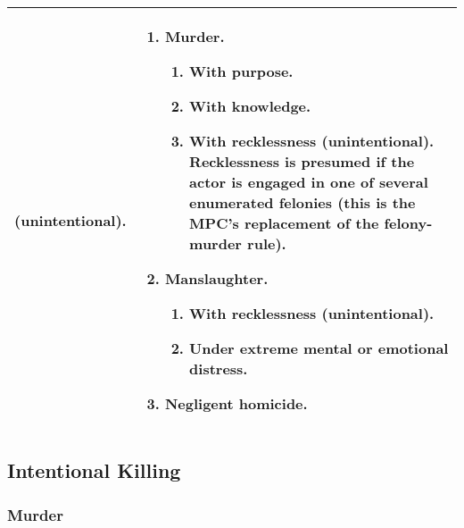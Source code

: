 \begin{tabular}{ | p{5.5cm} | p{5.5cm} |}
\begin{enumerate}
\begin{enumerate}
        (unintentional).
    \end{enumerate}
\end{enumerate}
&
\begin{enumerate}
    \item \textbf{Murder.}
    \begin{enumerate}
        \item With purpose.
        \item With knowledge.
        \item With recklessness (unintentional). Recklessness is presumed if 
        the actor is engaged in one of several enumerated felonies (this is 
        the MPC's replacement of the felony-murder rule).
    \end{enumerate}
    \item \textbf{Manslaughter.}
    \begin{enumerate}
        \item With recklessness (unintentional).
        \item Under extreme mental or emotional distress.
    \end{enumerate}
    \item \textbf{Negligent homicide.}
\end{enumerate}
\\ 
\hline
\end{tabular}

\subsection{Intentional Killing}

\subsubsection{Murder}

